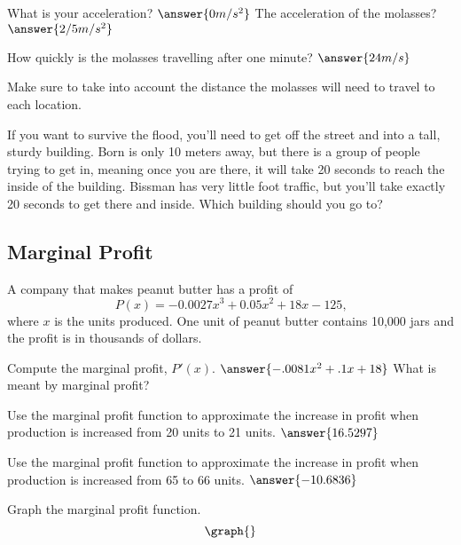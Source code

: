 \documentclass[handout]{ximera}
\begin{document}
\begin{question}
What is your acceleration? $\answer{0 m/s^2}$
The acceleration of the molasses? $\answer{2/5 m/s^2}$
\end{question}
\begin{question}
How quickly is the molasses travelling after one minute? $\answer{24m/s}$
\end{question}
\begin{question}
\begin{hint}
Make sure to take into account the distance the molasses will need to travel to each location.
\end{hint}If you want to survive the flood, you'll need to get off the street and into a tall, sturdy building. Born is only 10 meters away, but there is a group of people trying to get in, meaning once you are there, it will take 20 seconds to reach the inside of the building. Bissman has very little foot traffic, but you'll take exactly 20 seconds to get there and inside. Which building should you go to? \begin{multipleChoice}
\end{multipleChoice}\end{question}

\setcounter{problem}{0}
\subsection{Marginal Profit}
A company that makes peanut butter has a profit of $$P(x)=-0.0027x^3+0.05x^2+18x-125\text{,}$$ where $x$ is the units produced. One unit of peanut butter contains 10,000 jars and the profit is in thousands of dollars.
\begin{question}
Compute the marginal profit, $P'(x)$. $\answer{-.0081x^2+.1x+18}$
What is meant by marginal profit?
\begin{freeResponse}
\end{freeResponse}
\end{question}
\begin{question}
Use the marginal profit function to approximate the increase in profit when production is increased from 20 units to 21 units.
$\answer{16.5297}$
\end{question}
\begin{question}
Use the marginal profit function to approximate the increase in profit when production is increased from 65 to 66 units. $\answer{-10.6836}$
\end{question}
Graph the marginal profit function.
\[
\graph{}
\]
\end{document}
